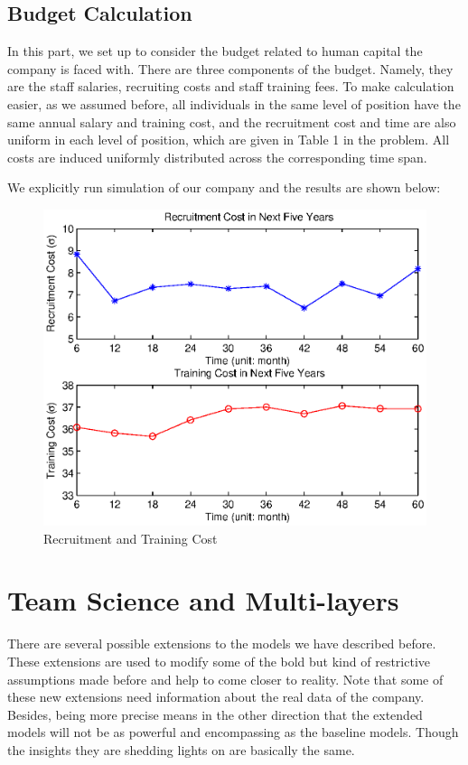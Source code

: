 \documentclass[tcn = 37075, sheet = true, abstract = true]{mcmthesis}
\begin{document}
\subsection{Budget Calculation}

In this part, we set up to consider the budget related to human capital the company is faced with. There are three components of the budget. Namely, they are the staff salaries, recruiting costs and staff training fees. To make calculation easier, as we assumed before, all individuals in the same level of position have the same annual salary and training cost, and the recruitment cost and time are also uniform in each level of position, which are given in Table 1 in the problem. All costs are induced uniformly distributed across the corresponding time span.

We explicitly run simulation of our company and the results are shown below:

\begin{figure}[htb!]
\centering
\includegraphics[width=14cm]{cost_figure.eps}
\caption{Recruitment and Training Cost} 
\label{fig:2}
\end{figure}

\section{Team Science and Multi-layers}
There are several possible extensions to the models we have described before. These extensions are used to modify some of the bold but kind of restrictive assumptions made before and help to come closer to reality. Note that some of these new extensions need information about the real data of the company. Besides, being more precise means in the other direction that the extended models will not be as powerful and encompassing as the baseline models. Though the insights they are shedding lights on are basically the same.
\end{document}
